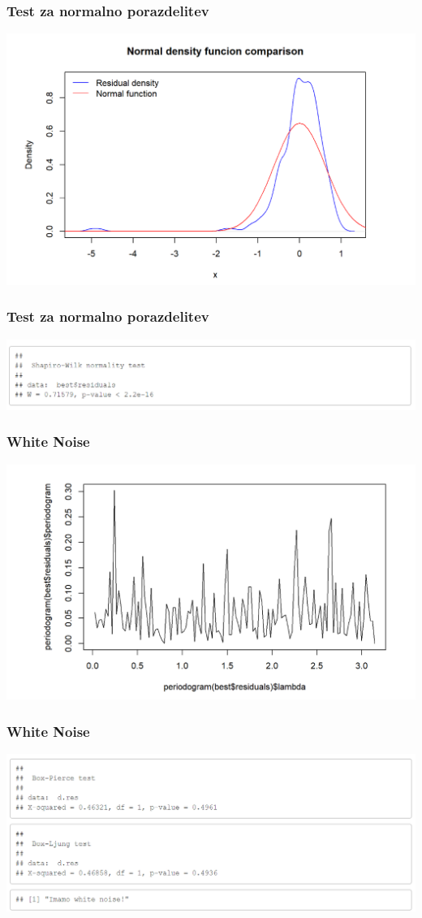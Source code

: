 \documentclass[10pt]{beamer}
\begin{document}
\begin{frame}
\frametitle{Test za normalno porazdelitev}
\includegraphics[width=1\textwidth]{normalnaB.png}

\end{frame}

\begin{frame}
\frametitle{Test za normalno porazdelitev}
\includegraphics[width=1\textwidth]{ShapiroB.png}

\end{frame}


\begin{frame}
\frametitle{White Noise}
\includegraphics[width=1\textwidth]{white_noiseB.png}
\end{frame}

\begin{frame}
\frametitle{White Noise}
\includegraphics[width=1\textwidth]{testwnB.png}
\end{frame}
\end{document}
